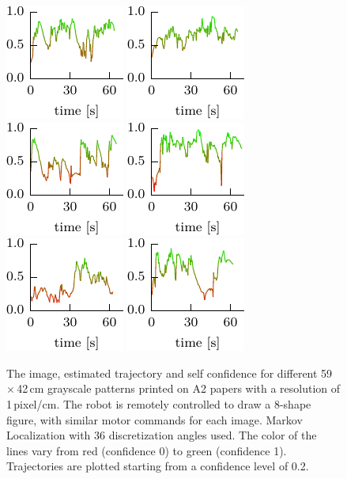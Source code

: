 \documentclass[letterpaper, 10pt, conference]{ieeeconf}
\begin{document}
\begin{figure}
\includegraphics[width=.15\textwidth]{breugel_babel-conf} \hfill
\includegraphics[width=.15\textwidth]{van-gogh_starry-night-conf} \hfill
\includegraphics[width=.15\textwidth]{kandinsky_comp-8-conf} \hfill
\includegraphics[width=.15\textwidth]{vermeer_girl-pearl-conf} \hfill
\includegraphics[width=.15\textwidth]{babar-conf} \hfill
\includegraphics[width=.15\textwidth]{child-drawing_tooth-fairy-conf}

\caption{The image, estimated trajectory and self confidence for different 59\,$\times$\,42\,cm grayscale patterns printed on A2 papers with a resolution of 1\,pixel/cm.
The robot is remotely controlled to draw a 8-shape figure, with similar motor commands for each image.
Markov Localization with 36 discretization angles used.
The color of the lines vary from red (confidence 0) to green (confidence 1).
Trajectories are plotted starting from a confidence level of 0.2.}
\label{fig:a2_drawings}

\end{figure}
\end{document}

